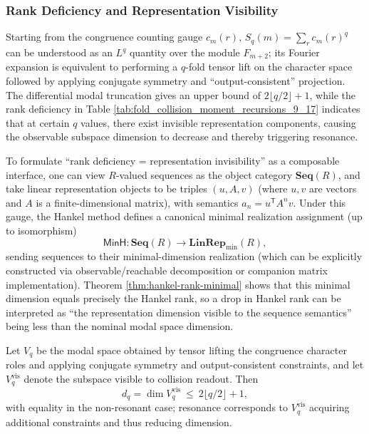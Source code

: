 \subsubsection{Rank Deficiency and Representation Visibility}\label{subsec:pom-moment-visibility}
Starting from the congruence counting gauge \(c_m(r)\), \(S_q(m)=\sum_r c_m(r)^q\) can be understood as an \(L^q\) quantity over the module \(F_{m+2}\); its Fourier expansion is equivalent to performing a \(q\)-fold tensor lift on the character space followed by applying conjugate symmetry and ``output-consistent'' projection. The differential modal truncation gives an upper bound of \(2\lfloor q/2\rfloor+1\), while the rank deficiency in Table \ref{tab:fold_collision_moment_recursions_9_17} indicates that at certain \(q\) values, there exist invisible representation components, causing the observable subspace dimension to decrease and thereby triggering resonance.

\begin{remark}\label{rem:pom-minh-functor}
To formulate ``rank deficiency = representation invisibility'' as a composable interface, one can view \(R\)-valued sequences as the object category \(\mathbf{Seq}(R)\), and take linear representation objects to be triples \((u,A,v)\) (where \(u,v\) are vectors and \(A\) is a finite-dimensional matrix), with semantics
\(
a_n=u^{\mathsf T}A^n v
\).
Under this gauge, the Hankel method defines a canonical minimal realization assignment (up to isomorphism)
\[
\mathsf{MinH}:\mathbf{Seq}(R)\to \mathbf{LinRep}_{\min}(R),
\]
sending sequences to their minimal-dimension realization (which can be explicitly constructed via observable/reachable decomposition or companion matrix implementation).
Theorem \ref{thm:hankel-rank-minimal} shows that this minimal dimension equals precisely the Hankel rank, so a drop in Hankel rank can be interpreted as ``the representation dimension visible to the sequence semantics'' being less than the nominal modal space dimension.
\end{remark}

\begin{conjecture}\label{conj:pom-moment-visible}
Let \(V_q\) be the modal space obtained by tensor lifting the congruence character roles and applying conjugate symmetry and output-consistent constraints, and let \(V_q^{\mathrm{vis}}\) denote the subspace visible to collision readout. Then
\[
d_q=\dim V_q^{\mathrm{vis}}\ \le\ 2\lfloor q/2\rfloor+1,
\]
with equality in the non-resonant case; resonance corresponds to \(V_q^{\mathrm{vis}}\) acquiring additional constraints and thus reducing dimension.
\end{conjecture}


